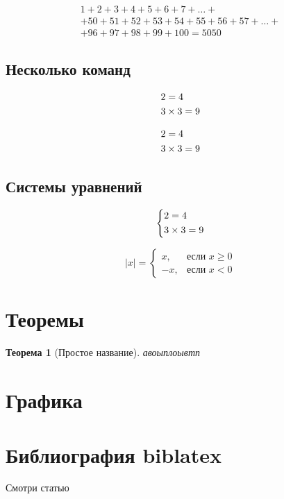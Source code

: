 \documentclass[a4paper, 12pt]{article}
\theoremstyle{plain} %
\newtheorem{theorem}{Теорема}[section]
\theoremstyle{definition}	%
\theoremstyle{remark}	%
\begin{document}
	\begin{multline}
	1+2+3+4+5+6+7+\dots+\\+ 50+51+52+53+54+55+56+57+\dots+\\+ 96+97+98+99+100=5050
	\end{multline}

	\subsection{Несколько команд}
	
	\begin{align}
		&2\time 2=4\\
		&3\times 3=9
	\end{align}

	\begin{equation}
	\begin{aligned}
		&2\time 2=4\\
		&3\times 3=9
	\end{aligned}	
	\end{equation}

	\subsection{Системы уравнений}
	
	\[
	\left\{
	\begin{aligned}
		&2\time 2=4\\
		&3\times 3=9
	\end{aligned}
	\right.
	\]
	
	\[
	|x|=
	\begin{cases}
		x, &\text{если } x \ge 0\\
		-x, &\text{если } x < 0
	\end{cases}
	\]
	
	\section{Теоремы}
	
	\begin{theorem}[Простое название]
		авоыплоывтп
	\end{theorem}

	\section{Графика}
	


	\section{Библиография biblatex}
	Смотри статью \cite{бухгольц2013основной}
	\printbibliography
	
	
	
	
	
	
	
\end{document}
